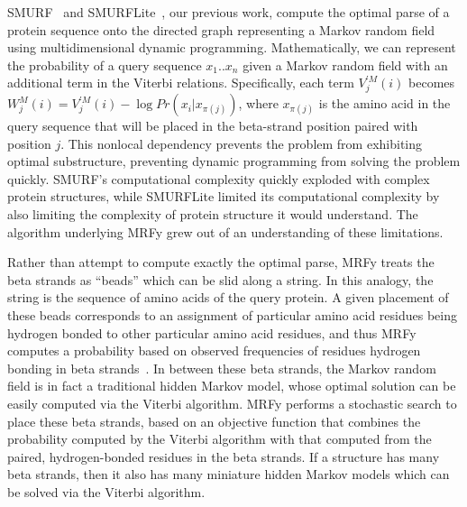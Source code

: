 \documentclass[preprint,nonatbib,blockstyle,nocopyrightspace,times]{sigplanconf}
\let\cite\citep
\begin{document}
SMURF~\cite{Menke:2010ti} and SMURFLite~\cite{Daniels:2012}, our previous work,
compute the 
optimal parse of a protein sequence onto the directed graph representing a 
Markov random field using multidimensional dynamic programming.
Mathematically, we can represent the probability of a query sequence 
$x_{1}..x_{n}$ given a Markov random field with an additional term in the
Viterbi relations.
Specifically, each term $V_{j}^{\prime M}(i)$ becomes
$W_{j}^{M}(i) = V_{j}^{\prime M}(i) - \log Pr(x_{i} | x_{\pi(j)})$, where
$x_{\pi(j)}$ is the amino acid in the query sequence that will be placed
in the beta-strand position paired with position $j$.
This nonlocal dependency prevents the problem from exhibiting optimal substructure,
preventing dynamic programming from solving the problem quickly.
SMURF's 
computational complexity quickly exploded with complex protein structures, 
while SMURFLite limited its computational complexity by also limiting the 
complexity of protein structure it would understand.
The algorithm underlying 
MRFy grew out of an understanding of these limitations.


Rather than attempt to compute exactly the optimal parse, MRFy treats the beta 
strands as ``beads'' which can be slid along a string.
In this analogy, the 
string is the sequence of amino acids of the query protein.
A given placement 
of these beads corresponds to an assignment of particular amino acid residues 
being hydrogen bonded to other particular amino acid residues, and thus MRFy 
computes a probability based on observed frequencies of residues hydrogen 
bonding in beta strands~\cite{Cowen:2002p588}.
In between these beta strands, the 
Markov random field is in fact a traditional hidden Markov model, whose optimal 
solution can be easily computed via the Viterbi algorithm.
MRFy performs a 
stochastic search to place these beta strands, based on an objective function 
that combines the probability computed by the Viterbi algorithm with that 
computed from the paired, hydrogen-bonded residues in the beta strands.
If a 
structure has many beta strands, then it also has many miniature hidden Markov 
models which can be solved via the Viterbi algorithm.
\end{document}
